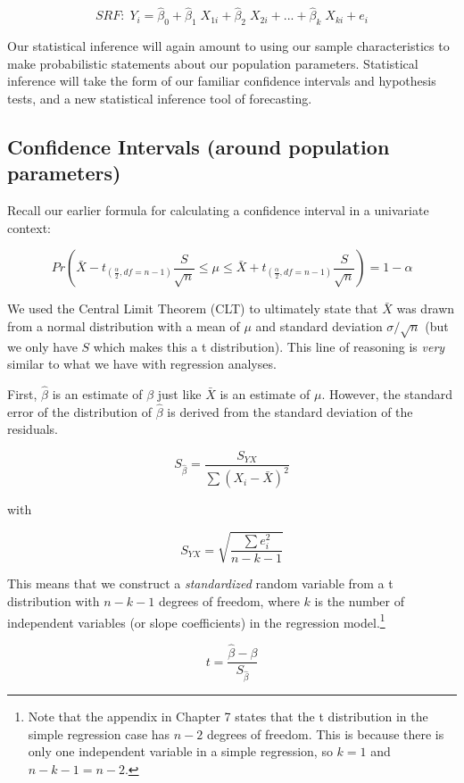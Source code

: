 \documentclass[
]{book}
\begin{document}
\[SRF:\;Y_i=\hat{\beta}_0+\hat{\beta}_1\;X_{1i}+\hat{\beta}_2\;X_{2i}+...+\hat{\beta}_k\;X_{ki}+e_i\]

Our statistical inference will again amount to using our sample characteristics to make probabilistic statements about our population parameters. Statistical inference will take the form of our familiar confidence intervals and hypothesis tests, and a new statistical inference tool of forecasting.

\subsection{Confidence Intervals (around population parameters)}\label{confidence-intervals-around-population-parameters-1}

Recall our earlier formula for calculating a confidence interval in a univariate context:

\[Pr\left(\bar{X}-t_{(\frac{\alpha}{2},df=n-1)}\frac{S}{\sqrt{n}} \leq \mu \leq \bar{X}+t_{(\frac{\alpha}{2},df=n-1)}\frac{S}{\sqrt{n}}\right)=1-\alpha\]

We used the Central Limit Theorem (CLT) to ultimately state that \(\bar{X}\) was drawn from a normal distribution with a mean of \(\mu\) and standard deviation \(\sigma/\sqrt{n}\) (but we only have \(S\) which makes this a t distribution). This line of reasoning is \emph{very} similar to what we have with regression analyses.

First, \(\hat{\beta}\) is an estimate of \(\beta\) just like \(\bar{X}\) is an estimate of \(\mu\). However, the standard error of the distribution of \(\hat{\beta}\) is derived from the standard deviation of the residuals.

\[S_{\hat{\beta}}=\frac{S_{YX}}{\sum{(X_i-\bar{X})^2}}\]

with

\[S_{YX} = \sqrt{ \frac{\sum e_i^2}{n-k-1} }\]

This means that we construct a \emph{standardized} random variable from a t distribution with \(n-k-1\) degrees of freedom, where \(k\) is the number of independent variables (or slope coefficients) in the regression model.\footnote{Note that the appendix in Chapter 7 states that the t distribution in the simple regression case has \(n-2\) degrees of freedom. This is because there is only one independent variable in a simple regression, so \(k=1\) and \(n-k-1 = n - 2\).}

\[t=\frac{\hat{\beta}-\beta}{S_{\hat{\beta}}}\]
\end{document}
